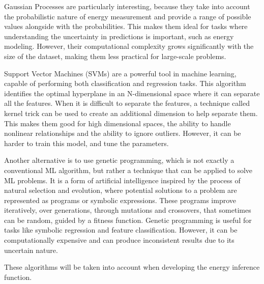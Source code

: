 Gaussian Processes are particularly interesting, because they take into account the probabilistic nature of energy measurement and provide a range of possible values alongside with the probabilities. This makes them ideal for tasks where understanding the uncertainty in predictions is important, such as energy modeling. However, their computational complexity grows significantly with the size of the dataset, making them less practical for large-scale problems.

Support Vector Machines (SVMs) are a powerful tool in machine learning, capable of performing both classification and regression tasks. This algorithm identifies the optimal hyperplane in an N-dimensional space where it can separate all the features. When it is difficult to separate the features, a technique called kernel trick can be used to create an additional dimension to help separate them. This makes them good for high dimensional spaces, the ability to handle nonlinear relationships and the ability to ignore outliers. However, it can be harder to train this model, and tune the parameters.

Another alternative is to use genetic programming, which is not exactly a conventional ML algorithm, but rather a technique that can be applied to solve ML problems. It is a form of artificial intelligence inspired by the process of natural selection and evolution, where potential solutions to a problem are represented as programs or symbolic expressions. These programs improve iteratively, over generations, through mutations and crossovers, that sometimes can be random, guided by a fitness function. Genetic programming is useful for tasks like symbolic regression and feature classification. However, it can be computationally expensive and can produce inconsistent results due to its uncertain nature.

These algorithms will be taken into account when developing the energy inference function.